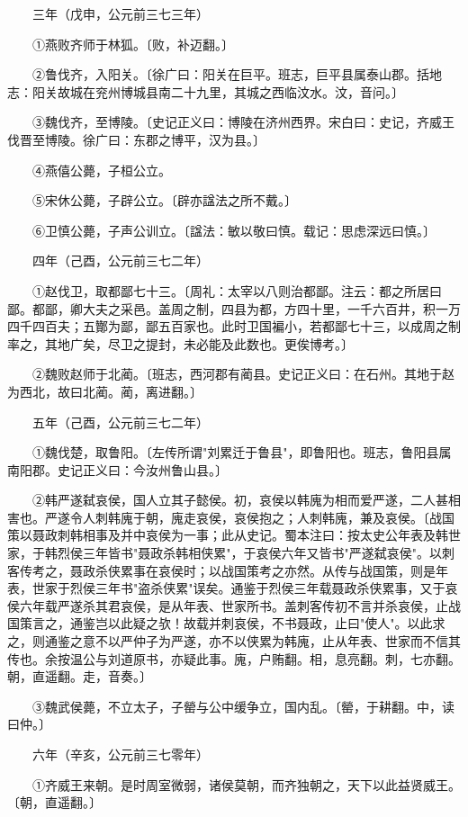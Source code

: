 　　三年（戊申，公元前三七三年）

　　①燕败齐师于林狐。〔败，补迈翻。〕

　　②鲁伐齐，入阳关。〔徐广曰：阳关在巨平。班志，巨平县属泰山郡。括地志：阳关故城在兖州博城县南二十九里，其城之西临汶水。汶，音问。〕

　　③魏伐齐，至博陵。〔史记正义曰：博陵在济州西界。宋白曰：史记，齐威王伐晋至博陵。徐广曰：东郡之博平，汉为县。〕

　　④燕僖公薨，子桓公立。

　　⑤宋休公薨，子辟公立。〔辟亦諡法之所不戴。〕

　　⑥卫慎公薨，子声公训立。〔諡法：敏以敬曰慎。载记：思虑深远曰慎。〕

　　四年（己酉，公元前三七二年）

　　①赵伐卫，取都鄙七十三。〔周礼：太宰以八则治都鄙。注云：都之所居曰鄙。都鄙，卿大夫之采邑。盖周之制，四县为都，方四十里，一千六百井，积一万四千四百夫；五酇为鄙，鄙五百家也。此时卫国褊小，若都鄙七十三，以成周之制率之，其地广矣，尽卫之提封，未必能及此数也。更俟博考。〕

　　②魏败赵师于北蔺。〔班志，西河郡有蔺县。史记正义曰：在石州。其地于赵为西北，故曰北蔺。蔺，离进翻。〕

　　五年（己酉，公元前三七二年）

　　①魏伐楚，取鲁阳。〔左传所谓"刘累迁于鲁县"，即鲁阳也。班志，鲁阳县属南阳郡。史记正义曰：今汝州鲁山县。〕

　　②韩严遂弑哀侯，国人立其子懿侯。初，哀侯以韩廆为相而爱严遂，二人甚相害也。严遂令人刺韩廆于朝，廆走哀侯，哀侯抱之；人刺韩廆，兼及哀侯。〔战国策以聂政刺韩相事及并中哀侯为一事；此从史记。蜀本注曰：按太史公年表及韩世家，于韩烈侯三年皆书"聂政杀韩相侠累"，于哀侯六年又皆书"严遂弑哀侯"。以刺客传考之，聂政杀侠累事在哀侯时；以战国策考之亦然。从传与战国策，则是年表，世家于烈侯三年书"盗杀侠累"误矣。通鉴于烈侯三年载聂政杀侠累事，又于哀侯六年载严遂杀其君哀侯，是从年表、世家所书。盖刺客传初不言并杀哀侯，止战国策言之，通鉴岂以此疑之欤！故载并刺哀侯，不书聂政，止曰"使人"。以此求之，则通鉴之意不以严仲子为严遂，亦不以侠累为韩廆，止从年表、世家而不信其传也。余按温公与刘道原书，亦疑此事。廆，户贿翻。相，息亮翻。刺，七亦翻。朝，直遥翻。走，音奏。〕

　　③魏武侯薨，不立太子，子罃与公中缓争立，国内乱。〔罃，于耕翻。中，读曰仲。〕

　　六年（辛亥，公元前三七零年）

　　①齐威王来朝。是时周室微弱，诸侯莫朝，而齐独朝之，天下以此益贤威王。〔朝，直遥翻。〕


